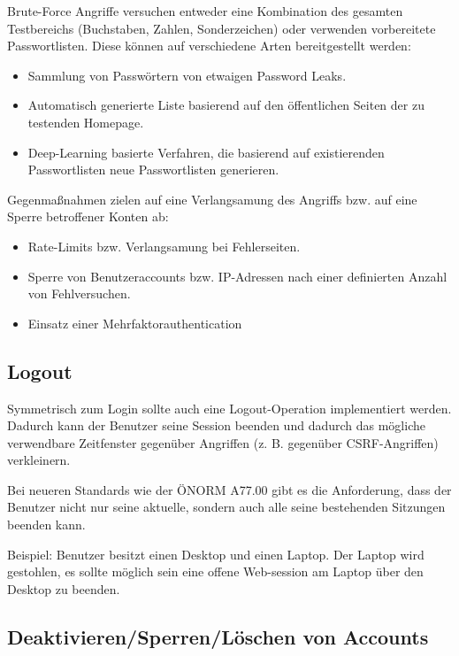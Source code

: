 Brute-Force Angriffe versuchen entweder eine Kombination des gesamten Testbereichs (Buchstaben, Zahlen, Sonderzeichen) oder verwenden vorbereitete Passwortlisten. Diese können auf verschiedene Arten bereitgestellt werden:

\begin{itemize}
	\item Sammlung von Passwörtern von etwaigen Password Leaks.
	\item Automatisch generierte Liste basierend auf den öffentlichen Seiten der zu testenden Homepage.
	\item Deep-Learning basierte Verfahren, die basierend auf existierenden Passwortlisten neue Passwortlisten generieren.
\end{itemize}

Gegenmaßnahmen zielen auf eine Verlangsamung des Angriffs bzw. auf eine Sperre betroffener Konten ab:

\begin{itemize}
	\item Rate-Limits bzw. Verlangsamung bei Fehlerseiten.
	\item Sperre von Benutzeraccounts bzw. IP-Adressen nach einer definierten Anzahl von Fehlversuchen.
	\item Einsatz einer Mehrfaktorauthentication
\end{itemize}

\subsection{Logout}

Symmetrisch zum Login sollte auch eine Logout-Operation implementiert werden. Dadurch kann der Benutzer seine Session beenden und dadurch das mögliche verwendbare Zeitfenster gegenüber Angriffen (z. B. gegenüber CSRF-Angriffen) verkleinern.

Bei neueren Standards wie der ÖNORM A77.00 gibt es die Anforderung, dass der Benutzer nicht nur seine aktuelle, sondern auch alle seine bestehenden Sitzungen beenden kann.

Beispiel: Benutzer besitzt einen Desktop und einen Laptop. Der Laptop wird gestohlen, es sollte möglich sein eine offene Web-session am Laptop über den Desktop zu beenden.

\subsection{Deaktivieren/Sperren/Löschen von Accounts}

